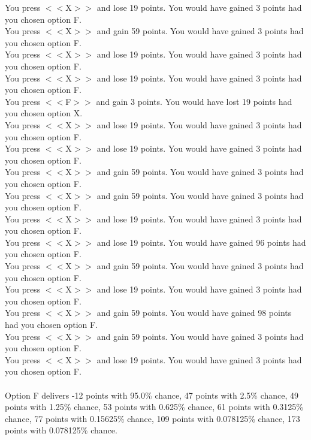 \documentclass[pdflatex,sn-nature]{sn-jnl}%
\theoremstyle{thmstyleone}%
\theoremstyle{thmstyletwo}%
\theoremstyle{thmstylethree}%
\begin{document}
You press $<<$X$>>$ and lose 19 points. You would have gained 3 points had you chosen option F. $~$\\ 
You press $<<$X$>>$ and gain 59 points. You would have gained 3 points had you chosen option F. $~$\\ 
You press $<<$X$>>$ and lose 19 points. You would have gained 3 points had you chosen option F. $~$\\ 
You press $<<$X$>>$ and lose 19 points. You would have gained 3 points had you chosen option F. $~$\\ 
You press $<<$F$>>$ and gain 3 points. You would have lost 19 points had you chosen option X. $~$\\ 
You press $<<$X$>>$ and lose 19 points. You would have gained 3 points had you chosen option F. $~$\\ 
You press $<<$X$>>$ and lose 19 points. You would have gained 3 points had you chosen option F. $~$\\ 
You press $<<$X$>>$ and gain 59 points. You would have gained 3 points had you chosen option F. $~$\\ 
You press $<<$X$>>$ and gain 59 points. You would have gained 3 points had you chosen option F. $~$\\ 
You press $<<$X$>>$ and lose 19 points. You would have gained 3 points had you chosen option F. $~$\\ 
You press $<<$X$>>$ and lose 19 points. You would have gained 96 points had you chosen option F. $~$\\ 
You press $<<$X$>>$ and gain 59 points. You would have gained 3 points had you chosen option F. $~$\\ 
You press $<<$X$>>$ and lose 19 points. You would have gained 3 points had you chosen option F. $~$\\ 
You press $<<$X$>>$ and gain 59 points. You would have gained 98 points had you chosen option F. $~$\\ 
You press $<<$X$>>$ and gain 59 points. You would have gained 3 points had you chosen option F. $~$\\ 
You press $<<$X$>>$ and lose 19 points. You would have gained 3 points had you chosen option F. $~$\\ 
 $~$\\ 
Option F delivers -12 points with 95.0\% chance, 47 points with 2.5\% chance, 49 points with 1.25\% chance, 53 points with 0.625\% chance, 61 points with 0.3125\% chance, 77 points with 0.15625\% chance, 109 points with 0.078125\% chance, 173 points with 0.078125\% chance. $~$\\ 
\end{document}
